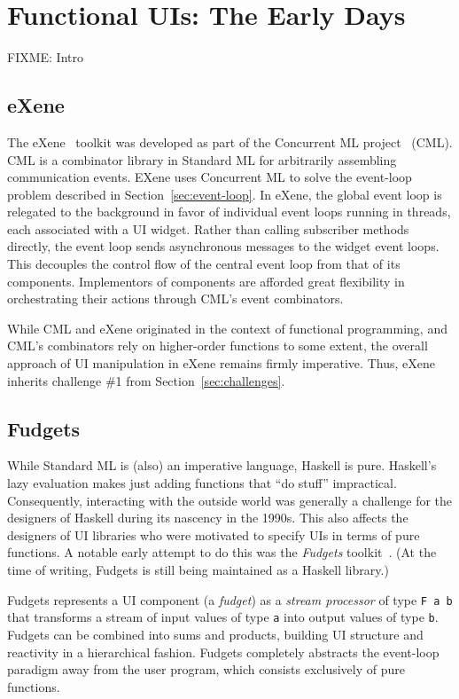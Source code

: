 \documentclass[sigplan,screen]{acmart}
\begin{document}
\section{Functional UIs: The Early Days}

FIXME: Intro

\subsection{eXene}

The eXene~\cite{eXene} toolkit was developed as part of the Concurrent
ML project~\cite{ConcurrentML} (CML).  CML is a combinator library in
Standard ML for arbitrarily assembling communication events.  EXene
uses Concurrent ML to solve the event-loop problem described in
Section~\ref{sec:event-loop}.  In eXene, the global event loop is
relegated to the background in favor of individual event loops running
in threads, each associated with a UI widget.  Rather than calling
subscriber methods directly, the event loop sends asynchronous
messages to the widget event loops.  This decouples the control flow
of the central event loop from that of its components.  Implementors
of components are afforded great flexibility in orchestrating their
actions through CML's event combinators.

While CML and eXene originated in the context of functional
programming, and CML's combinators rely on higher-order functions to
some extent, the overall approach of UI manipulation in eXene remains
firmly imperative.  Thus, eXene inherits challenge \#1 from Section~\ref{sec:challenges}.

\subsection{Fudgets}

While Standard ML is (also) an imperative language, Haskell is pure.
Haskell's lazy evaluation makes just adding functions that ``do
stuff'' impractical.  Consequently, interacting with the outside world
was generally a challenge for the designers of Haskell during its
nascency in the 1990s.  This also affects the designers of UI
libraries who were motivated to specify UIs in terms of pure
functions.  A notable early attempt to do this was the
\textit{Fudgets} toolkit~\cite{Fudgets}.  (At the time of writing,
Fudgets is still being maintained as a Haskell library.)

Fudgets represents a UI component (a \textit{fudget}) as a
\textit{stream processor} of type \verb|F a b| that transforms a
stream of input values of type \texttt{a} into output values of type
\texttt{b}.  Fudgets can be combined into sums and products, building
UI structure and reactivity in a hierarchical fashion.  Fudgets
completely abstracts the event-loop paradigm away from the user
program, which consists exclusively of pure functions.
\end{document}
